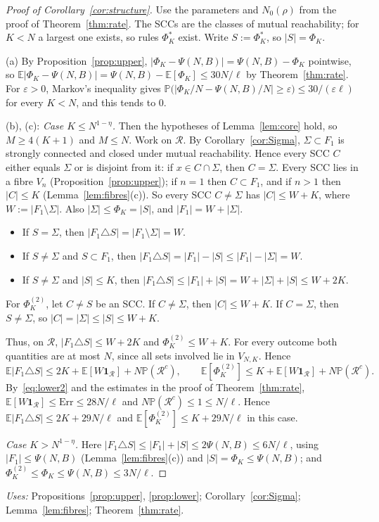 \documentclass[11pt]{amsart}
\theoremstyle{definition}
\newcommand{\E}{\mathbb{E}}
\newcommand{\Prob}{\mathbb{P}}
\newcommand{\cR}{\mathcal{R}}
\newcommand{\uses}[1]{\par\smallskip\noindent\textit{Uses:} #1\par\smallskip}
\begin{document}
\begin{proof}[Proof of Corollary~\ref{cor:structure}]
Use the parameters and $N_0(\rho)$ from the proof of Theorem~\ref{thm:rate}. The SCCs are the classes of mutual reachability; for $K<N$ a largest one exists, so rules $\Phi^*_K$ exist. Write $S:=\Phi^*_K$, so $|S|=\Phi_K$.

(a) By Proposition~\ref{prop:upper}, $|\Phi_K-\Psi(N,B)|=\Psi(N,B)-\Phi_K$ pointwise, so $\E|\Phi_K-\Psi(N,B)|=\Psi(N,B)-\E[\Phi_K]\le30N/\ell$ by Theorem~\ref{thm:rate}. For $\varepsilon>0$, Markov's inequality gives $\Prob\bigl(|\Phi_K/N-\Psi(N,B)/N|\ge\varepsilon\bigr)\le30/(\varepsilon\ell)$ for every $K<N$, and this tends to $0$.

(b), (c): \emph{Case $K\le N^{1-\eta}$.} Then the hypotheses of Lemma~\ref{lem:core} hold, so $M\ge4(K+1)$ and $M\le N$. Work on $\cR$. By Corollary~\ref{cor:Sigma}, $\Sigma\subset F_1$ is strongly connected and closed under mutual reachability. Hence every SCC $C$ either equals $\Sigma$ or is disjoint from it: if $x\in C\cap\Sigma$, then $C=\Sigma$. Every SCC lies in a fibre $V_n$ (Proposition~\ref{prop:upper}); if $n=1$ then $C\subset F_1$, and if $n>1$ then $|C|\le K$ (Lemma~\ref{lem:fibres}(c)). So every SCC $C\ne\Sigma$ has $|C|\le W+K$, where $W:=|F_1\setminus\Sigma|$. Also $|\Sigma|\le\Phi_K=|S|$, and $|F_1|=W+|\Sigma|$.
\begin{itemize}
\item If $S=\Sigma$, then $|F_1\triangle S|=|F_1\setminus\Sigma|=W$.
\item If $S\ne\Sigma$ and $S\subset F_1$, then $|F_1\triangle S|=|F_1|-|S|\le|F_1|-|\Sigma|=W$.
\item If $S\ne\Sigma$ and $|S|\le K$, then $|F_1\triangle S|\le|F_1|+|S|=W+|\Sigma|+|S|\le W+2K$.
\end{itemize}
For $\Phi^{(2)}_K$, let $C\ne S$ be an SCC. If $C\ne\Sigma$, then $|C|\le W+K$. If $C=\Sigma$, then $S\ne\Sigma$, so $|C|=|\Sigma|\le|S|\le W+K$.

Thus, on $\cR$, $|F_1\triangle S|\le W+2K$ and $\Phi^{(2)}_K\le W+K$. For every outcome both quantities are at most $N$, since all sets involved lie in $V_{N,K}$. Hence
\[
\E|F_1\triangle S|\le2K+\E[W\mathbf 1_\cR]+N\Prob(\cR^c),\qquad\E[\Phi^{(2)}_K]\le K+\E[W\mathbf 1_\cR]+N\Prob(\cR^c).
\]
By~\eqref{eq:lower2} and the estimates in the proof of Theorem~\ref{thm:rate}, $\E[W\mathbf 1_\cR]\le\mathrm{Err}\le 28N/\ell$ and $N\Prob(\cR^c)\le1\le N/\ell$. Hence $\E|F_1\triangle S|\le 2K+29N/\ell$ and $\E[\Phi^{(2)}_K]\le K+29N/\ell$ in this case.

\emph{Case $K>N^{1-\eta}$.} Here $|F_1\triangle S|\le|F_1|+|S|\le2\Psi(N,B)\le6N/\ell$, using $|F_1|\le\Psi(N,B)$ (Lemma~\ref{lem:fibres}(c)) and $|S|=\Phi_K\le\Psi(N,B)$; and $\Phi^{(2)}_K\le\Phi_K\le\Psi(N,B)\le3N/\ell$.
\end{proof}
\uses{Propositions~\ref{prop:upper}, \ref{prop:lower}; Corollary~\ref{cor:Sigma}; Lemma~\ref{lem:fibres}; Theorem~\ref{thm:rate}.}
\end{document}
